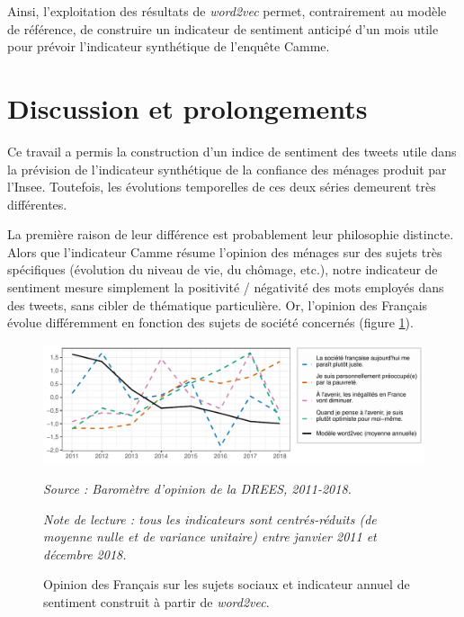 \documentclass[11pt,french,french]{article}
\begin{document}
Ainsi, l'exploitation des résultats de \emph{word2vec} permet, contrairement au modèle de référence, de construire un indicateur de sentiment anticipé d'un mois utile pour prévoir l'indicateur synthétique de l'enquête Camme.

\hypertarget{discussion-et-prolongements}{%
\section*{Discussion et prolongements}\label{discussion-et-prolongements}}

Ce travail a permis la construction d'un indice de sentiment des tweets utile dans la prévision de l'indicateur synthétique de la confiance des ménages produit par l'Insee. Toutefois, les évolutions temporelles de ces deux séries demeurent très différentes.

La première raison de leur différence est probablement leur philosophie distincte. Alors que l'indicateur Camme résume l'opinion des ménages sur des sujets très spécifiques (évolution du niveau de vie, du chômage, etc.), notre indicateur de sentiment mesure simplement la positivité / négativité des mots employés dans des tweets, sans cibler de thématique particulière. Or, l'opinion des Français évolue différemment en fonction des sujets de société concernés (figure \ref{fig:figconclu}).

\begin{figure}[htp]
{\centering \includegraphics[width =\textwidth]{img/rmd-graphConclu-1}}
\captionsetup{margin=0cm,format=hang,justification=justified}
\caption{Opinion des Français sur les sujets sociaux et indicateur annuel de sentiment construit à partir de \emph{word2vec}.}\label{fig:figconclu}
\footnotesize
\emph{Source : Baromètre d'opinion de la DREES, 2011-2018.}

\emph{Note de lecture : tous les indicateurs sont centrés-réduits (de moyenne nulle et de variance unitaire) entre janvier 2011 et décembre 2018.}
\end{figure}
\end{document}
